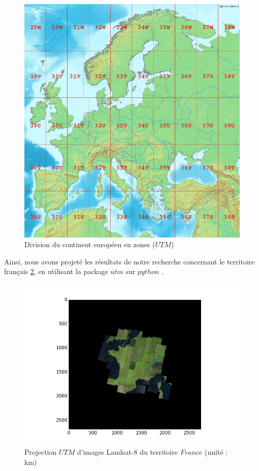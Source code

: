 \documentclass{book}
\begin{document}
\begin{figure}[H]
\begin{center}
\includegraphics[scale=0.3]{images/utm_zones_europe.png}
\end{center}
\caption{Division du continent européen en zones ($UTM$) \cite{wiki:utm}}
\label{utm_france}
\end{figure}

\clearpage

Ainsi, nous avons projeté les résultats de notre recherche concernant le territoire français \ref{projection_france}, en utilisant 
la package $utm$ sur $python$ \cite{utm_package}.

\begin{figure}[H]
\begin{center}
\includegraphics[scale=0.8]{images/projection_france.png}
\end{center}
\caption{Projection $UTM$ d'images Landsat-8 du territoire $France$ (unité : km)}
\label{projection_france}
\end{figure}
\end{document}
